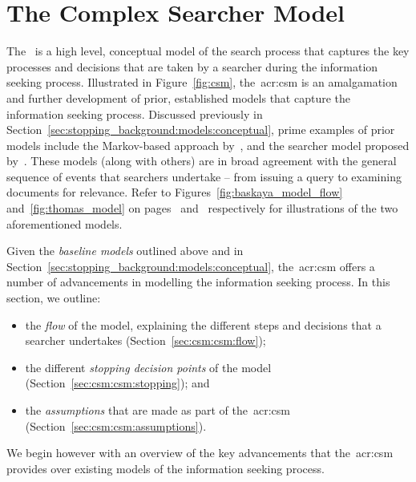 \section{The Complex Searcher Model}\label{sec:csm:csm}
The~ is a high level, conceptual model of the search process that captures the key processes and decisions that are taken by a searcher during the information seeking process. Illustrated in Figure~\ref{fig:csm}, the~\gls{acr:csm} is an amalgamation and further development of prior, established models that capture the information seeking process. Discussed previously in Section~\ref{sec:stopping_background:models:conceptual}, prime examples of prior models include the Markov-based approach by~\cite{baskaya2013behavioural_factors}, and the searcher model proposed by~\cite{thomas2014modelling_behaviour}. These models (along with others) are in broad agreement with the general sequence of events that searchers undertake -- from issuing a query to examining documents for relevance. Refer to Figures~\ref{fig:baskaya_model_flow} and~\ref{fig:thomas_model} on pages~\pageref{fig:baskaya_model_flow} and~\pageref{fig:thomas_model} respectively for illustrations of the two aforementioned models.

Given the \emph{baseline models} outlined above and in Section~\ref{sec:stopping_background:models:conceptual}, the~\gls{acr:csm} offers a number of advancements in modelling the information seeking process. In this section, we outline:

\begin{itemize}
    \item{the \emph{flow} of the model, explaining the different steps and decisions that a searcher undertakes (Section~\ref{sec:csm:csm:flow});}
    \item{the different \emph{stopping decision points} of the model (Section~\ref{sec:csm:csm:stopping}); and}
    \item{the \emph{assumptions} that are made as part of the~\gls{acr:csm} (Section~\ref{sec:csm:csm:assumptions}).}
\end{itemize}

We begin however with an overview of the key advancements that the~\gls{acr:csm} provides over existing models of the information seeking process.

